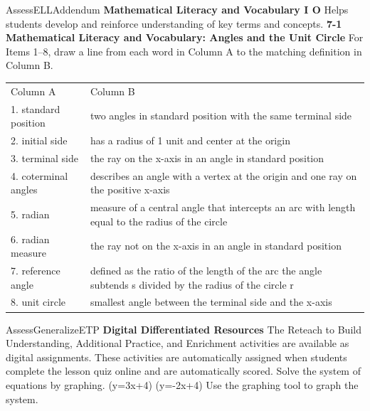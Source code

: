 \documentclass{article}
\newenvironment{te-addendum}[2]{}{}     %
\newcommand{\answer}[1]{}               %
\newcommand{\placeholder}[2]{}          %
\newcommand{\te}[1]{}                   %
\begin{document}
\begin{te-addendum}{Assess}{ELLAddendum}
\textbf{Mathematical Literacy and Vocabulary I O}
Helps students develop and reinforce understanding of key terms and concepts.
\textbf{7-1 Mathematical Literacy and Vocabulary: Angles and the Unit Circle}
For Items 1--8, draw a line from each word in Column A to the matching definition in Column B.
\begin{tabular}{ll}
Column A & Column B \\
1. standard position & two angles in standard position with the same terminal side \\
2. initial side & has a radius of 1 unit and center at the origin \\
3. terminal side & the ray on the x-axis in an angle in standard position \\
4. coterminal angles & describes an angle with a vertex at the origin and one ray on the positive x-axis \\
5. radian & measure of a central angle that intercepts an arc with length equal to the radius of the circle \\
6. radian measure & the ray not on the x-axis in an angle in standard position \\
7. reference angle & defined as the ratio of the length of the arc the angle subtends s divided by the radius of the circle r \\
8. unit circle & smallest angle between the terminal side and the x-axis \\
\end{tabular}
\answer{Printed matching lines connect1 to definition4;2 to3;3 to6;4 to1;5 to5;6 to7;7 to8;8 to2.}
\end{te-addendum}
\begin{te-addendum}{Assess}{GeneralizeETP}
\textbf{Digital Differentiated Resources}
The Reteach to Build Understanding, Additional Practice, and Enrichment activities are available as digital assignments. These activities are automatically assigned when students complete the lesson quiz online and are automatically scored.
Solve the system of equations by graphing.
(y=3x+4)
(y=-2x+4)
Use the graphing tool to graph the system.
\placeholder{graph}{Digital screenshot blank coordinate grid, x,y axes labeled, unit grid with even-number labels-10 to10 both axes, arrowheads; no plotted lines. Question Help menu overlays upper right.}
\te{Tablet controls: Exit; Question Help; Help Me Solve This; View an Example; Video; Textbook; Glossary; Math Tools; Print; Click to enlarge graph; Click the graph, choose a tool in the palette and follow the instructions to create your graph.;1 part remaining; Clear All; Check Answer; Review progress; Question5 of14; Go; Back; Next. Resource previews include Name blanks, enVision Algebra2, SavvasRealize.com, and Teaching Resources footers.}
\end{te-addendum}
\end{document}
